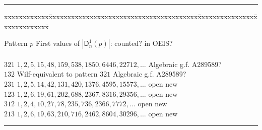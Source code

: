 \documentclass[12pt]{amsart}
\numberwithin{equation}{section}
\theoremstyle{plain}
\theoremstyle{definition}
\newcommand\D{\mathsf{D}}
\begin{document}
\begin{table}
\hrule


{\small
\begin{tabbing}
xxxxxxxxxxxx\=xxxxxxxxxxxxxxxxxxxxxxxxxxxxxxxxxxxxxxxx\= xxxxxxxxxxxxxxx\=xxxxxxxxxxxxx\= \kill

Pattern $p$\> First values of $|\D_n^1(p)|$: \> counted?\> in OEIS?\\
\\

$321$\> $ 1, 2, 5, 15, 48, 159, 538, 1850, 6446,22712,\ldots$ \> Algebraic g.f.   \> A289589?   \\
$132$\> Wilf-equivalent to pattern $321$ \> Algebraic g.f.  \> A289589?   \\
$231$\> $1,2,5,14,42,131,420,1376,4595,15573,\ldots$ \> open  \> new   \\
$123$\> $1, 2, 6, 19, 61, 202, 688, 2367,8316,29356,\ldots$\> open  \> new   \\
$312$\> $1, 2, 4, 10, 27, 78, 235, 736,2366,7772,\ldots$\> open  \> new    \\
$213$\>  $1, 2, 6, 19, 63, 210, 716, 2462,8604,30296,\ldots$ \> open  \> new 
\vspace{.1in}
\end{tabbing}
}

\hrule
\vspace{.2in}

\caption{Length-$3$ patterns  for $1$-arrangements in derangement form}
\label{3-derange}
\end{table}
\end{document}
